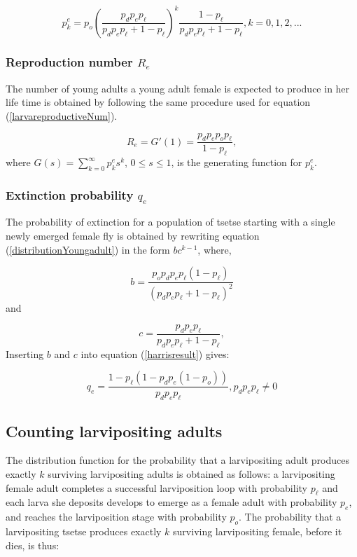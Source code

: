 \documentclass[smallextended]{svjour3}
\begin{document}
\begin{equation}
\label{distributionYoungadult}
p_{k}^{e} = p_{o}(\frac{p_{d}p_{e}p_{\ell}}{p_{d}p_{e}p_{\ell} + 1 - p_{\ell}} )^{k}\frac{1-p_{\ell}}{p_{d}p_{e}p_{\ell} + 1 - p_{\ell}}, k =0,1,2,...
\end{equation}      

\subsubsection{Reproduction number $R_{e}$}

The number of young adults a young adult female is expected to produce in her life time is obtained by following the same procedure used for equation (\ref{larvareproductiveNum}).

\begin{equation}
\label{YoungAdulreproductiveNum}
R_{e} = G'(1) = \frac{p_{d}p_{e}p_{o}p_\ell}{1-p_\ell},
\end{equation}  
where $G(s) = \sum_{k=0}^{\infty} p_{k}^{e}s^{k}  $, $0\leq s \leq 1$, is the generating function for $p_{k}^{e}$.

\subsubsection{Extinction probability  $q_{e}$}

The probability of extinction for a population of tsetse starting with a single newly emerged female fly is obtained by rewriting equation (\ref{distributionYoungadult}) in the form $bc^{k-1}$, where,

$$ b = \frac{p_{o}p_{d}p_{e}p_{\ell}(1-p_{\ell})}{(p_{d}p_{e}p_{\ell} + 1 - p_{\ell})^{2}} $$ and

$$ c = \frac{p_{d}p_{e}p_{\ell}}{p_{d}p_{e}p_{\ell} + 1 - p_{\ell}} , $$ 
Inserting $b$ and $c$ into equation (\ref{harrisresult}) gives:

\begin{equation}
\label{extinctionYoungadult}
q_{e} = \frac{1- p_{\ell}(1 -p_{d}p_{e}(1- p_{o}))}{p_{d}p_{e}p_{\ell}},  p_{d}p_{e}p_{\ell} \neq 0
\end{equation}

\subsection{Counting larvipositing adults}

The distribution function for the probability that a larvipositing  adult produces exactly $k$ surviving larvipositing adults is obtained as follows: a larvipositing female adult completes  a successful  larviposition loop with probability $p_{\ell}$ and each larva she deposits develops to emerge as a female adult with probability $p_{e}$, and reaches the larviposition stage with probability $p_{o}$.  The probability that a larvipositing tsetse produces exactly $k$ surviving larvipositing female, before it dies, is thus:
\end{document}
